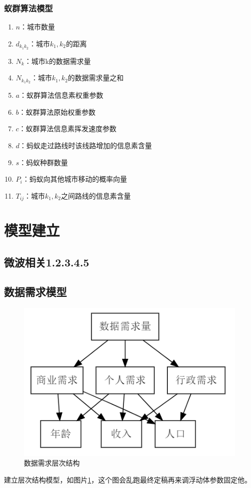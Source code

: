 \documentclass[UTF8,12pt]{ctexart}
\begin{document}
      \subsubsection{蚁群算法模型}
        \begin{enumerate}
            \item $n$：城市数量
            \item $d_{k_1k_2}$：城市$k_1,k_2$的距离
            \item $N_k$：城市k的数据需求量
            \item $N_{k_1k_2}$：城市$k_1,k_2$的数据需求量之和
            \item $a$：蚁群算法信息素权重参数
            \item $b$：蚁群算法原始权重参数
            \item $c$：蚁群算法信息素挥发速度参数
            \item $d$：蚂蚁走过路线时该线路增加的信息素含量
            \item $s$：蚂蚁种群数量
            \item $P_i$：蚂蚁向其他城市移动的概率向量
            \item $T_{ij}$：城市$k_1,k_2$之间路线的信息素含量
        \end{enumerate}





\section{模型建立}
    \subsection{微波相关1.2.3.4.5}


    \subsection{数据需求模型}\label{ShuJv}
            \begin{figure}[]
                    \centering
                    \includegraphics{need.png}
                    \caption{数据需求层次结构}\label{SJXQCCJG}
                \end{figure}
        建立层次结构模型，如图片\ref{SJXQCCJG}，这个图会乱跑最终定稿再来调浮动体参数固定他。
\end{document}
